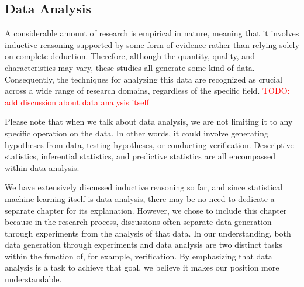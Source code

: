 

\subsection{Data Analysis}
A considerable amount of research is empirical in nature, meaning that it involves inductive reasoning supported by some form of evidence rather than relying solely on complete deduction. Therefore, although the quantity, quality, and characteristics may vary, these studies all generate some kind of data. Consequently, the techniques for analyzing this data are recognized as crucial across a wide range of research domains, regardless of the specific field. \textcolor{red}{TODO: add discussion about data analysis itself}

Please note that when we talk about data analysis, we are not limiting it to any specific operation on the data. In other words, it could involve generating hypotheses from data, testing hypotheses, or conducting verification. Descriptive statistics, inferential statistics, and predictive statistics are all encompassed within data analysis.

We have extensively discussed inductive reasoning so far, and since statistical machine learning itself is data analysis, there may be no need to dedicate a separate chapter for its explanation. However, we chose to include this chapter because in the research process, discussions often separate data generation through experiments from the analysis of that data. In our understanding, both data generation through experiments and data analysis are two distinct tasks within the function of, for example, verification. By emphasizing that data analysis is a task to achieve that goal, we believe it makes our position more understandable. 

